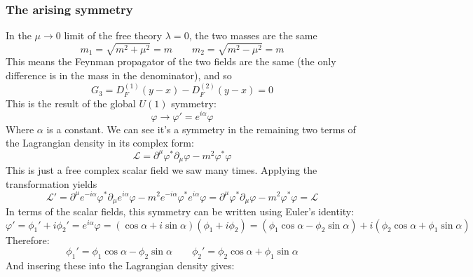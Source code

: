 \documentclass{article}
\begin{document}
\subsubsection{The arising symmetry}
In the $\mu \rightarrow 0$ limit of the free theory $\lambda = 0$, the two masses are the same
\begin{equation}
    m_1 = \sqrt{m^2 + \mu^2} = m
    \qquad
    m_2 = \sqrt{m^2 - \mu^2} = m
\end{equation}
This means the Feynman propagator of the two fields are the same (the only difference is in the mass in the denominator), and so
\begin{equation}
    G_3 = D_F^{(1)}(y - x) - D_F^{(2)}(y - x) = 0
\end{equation}
This is the result of the global $U(1)$ symmetry:
\begin{equation}
    \varphi \rightarrow \varphi' = e^{i\alpha}\varphi
\end{equation}
Where $\alpha$ is a constant. We can see it's a symmetry in the remaining two terms of the Lagrangian density in its complex form:
\begin{equation}
    \mathcal{L} = \partial^\mu\varphi^*\partial_\mu\varphi - m^2\varphi^*\varphi
\end{equation}
This is just a free complex scalar field we saw many times. Applying the transformation yields
\begin{equation}
    \mathcal{L}' = \partial^\mu e^{-i\alpha}\varphi^*\partial_\mu e^{i\alpha}\varphi - m^2e^{-i\alpha}\varphi^*e^{i\alpha}\varphi = \partial^\mu \varphi^*\partial_\mu\varphi - m^2\varphi^*\varphi = \mathcal{L}
\end{equation}
In terms of the scalar fields, this symmetry can be written using Euler's identity:
\begin{equation}
    \varphi' = \phi_1' + i\phi_2' = e^{i\alpha}\varphi = (\cos\alpha + i\sin\alpha)(\phi_1 + i\phi_2) = (\phi_1\cos\alpha - \phi_2\sin\alpha) + i(\phi_2\cos\alpha + \phi_1\sin\alpha)
\end{equation}
Therefore:
\begin{equation}
    \phi_1' = \phi_1\cos\alpha - \phi_2\sin\alpha
    \qquad
    \phi_2' = \phi_2\cos\alpha + \phi_1\sin\alpha
\end{equation}
And insering these into the Lagrangian density gives:
\end{document}
